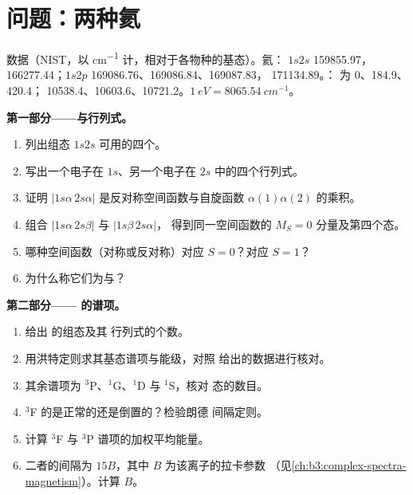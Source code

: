 \section{问题：两种氦}

\begin{problem}
\label{pb:b3:many-electron-atoms:1}
数据（NIST，以 \unit{cm^{-1}} 计，相对于各物种的基态）。氦：
$1s2s$  159855.97， 166277.44；$1s2p$
 169086.76、169086.84、169087.83，
171134.89。： 为 0、184.9、420.4；
10538.4、10603.6、10721.2。$\qty{1}{eV} = \qty{8065.54}{cm^{-1}}$。

\medskip\noindent\textbf{第一部分——与行列式。}
\begin{enumerate}
  \item 列出组态 $1s2s$ 可用的四个。
  \item 写出一个电子在 $1s$、另一个电子在
        $2s$ 中的四个行列式。
  \item 证明 $|1s\alpha\,2s\alpha|$ 是反对称空间函数与自旋函数
        $\alpha(1)\alpha(2)$ 的乘积。
  \item 组合 $|1s\alpha\,2s\beta|$ 与 $|1s\beta\,2s\alpha|$，
        得到同一空间函数的 $M_S = 0$ 分量及第四个态。
  \item 哪种空间函数（对称或反对称）对应
        $S = 0$？对应 $S = 1$？
  \item 为什么称它们为与？
\end{enumerate}

\medskip\noindent\textbf{第二部分—— 的谱项。}
\begin{enumerate}[resume]
  \item 给出  的组态及其
        行列式的个数。
  \item 用洪特定则求其基态谱项与能级，对照
        给出的数据进行核对。
  \item 其余谱项为 ${}^3$P、${}^1$G、${}^1$D 与 ${}^1$S，核对
        态的数目。
  \item ${}^3$F 的是正常的还是倒置的？检验朗德
        间隔定则。
  \item 计算 ${}^3$F 与 ${}^3$P 谱项的加权平均能量。
  \item 二者的间隔为 $15B$，其中 $B$ 为该离子的拉卡参数
        （见\cref{ch:b3:complex-spectra-magnetism}）。计算 $B$。
\end{enumerate}


\end{problem}
